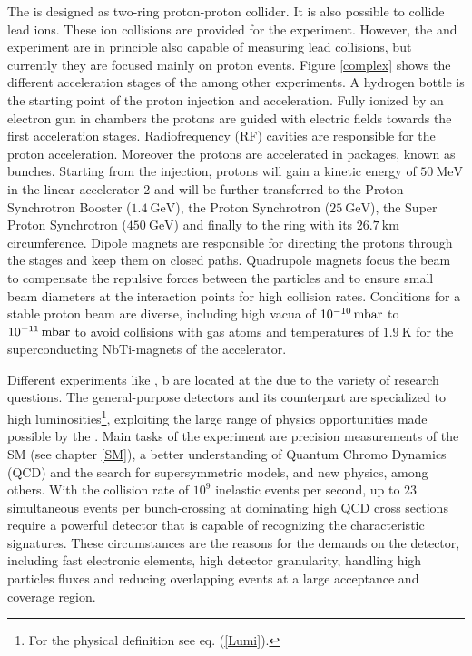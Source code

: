 The {\LHC} is designed as two-ring proton-proton collider. It is also possible to collide lead ions. These ion collisions are provided for the {\ALICE}\cite{ALICE} experiment. However, the {\ATLAS} and {\CMS} experiment are in principle also capable of measuring lead collisions, but currently they are focused mainly on proton events. Figure \ref{complex} shows the different acceleration stages of the {\LHC} among other {\CERN} experiments.\newline
A hydrogen bottle is the starting point of the proton injection and acceleration. Fully ionized by an electron gun in chambers the protons are guided with electric fields towards the first acceleration stages. Radiofrequency (RF) cavities are responsible for the proton acceleration. Moreover the protons are accelerated in packages, known as bunches. \cite{LHCJINST}\cite{LHCSchule} Starting from the injection, protons will gain a kinetic energy of $\SI{50}{\mega\electronvolt}$ in the linear accelerator {\LINAC}2 and will be further transferred to the Proton Synchrotron Booster ($\SI{1.4}{\giga\electronvolt}$), the Proton Synchrotron ($\SI{25}{\giga\electronvolt}$), the Super Proton Synchrotron ($\SI{450}{\giga\electronvolt}$) and finally to the {\LHC} ring with its $\SI{26.7}{\kilo\meter}$ circumference. \cite{CERNabout} Dipole magnets are responsible for directing the protons through the stages and keep them on closed paths. Quadrupole magnets focus the beam to compensate the repulsive forces between the particles and to ensure small beam diameters at the interaction points for high collision rates. Conditions for a stable proton beam are diverse, including high vacua of $\SI{E-10}{\milli\bar}$ to $\SI{E-11}{\milli\bar}$ to avoid collisions with gas atoms and temperatures of $\SI{1.9}{\kelvin}$ for the superconducting NbTi-magnets of the accelerator. \cite{LHCJINST}\cite{LHCSchule}\par
Different experiments like \ALICE\cite{ALICE}, {{\LHC}}b\cite{LHCb} are located at the {\LHC} due to the variety of research questions. The general-purpose detectors {\ATLAS} and its counterpart {\CMS}\cite{CMS} are specialized to high luminosities\footnote{For the physical definition see eq. (\ref{Lumi}).}, exploiting the large range of physics opportunities made possible by the {\LHC}. Main tasks of the {\ATLAS} experiment are precision measurements of the SM (see chapter \ref{SM}), a better understanding of Quantum Chromo Dynamics (QCD) and the search for supersymmetric models, and new physics, among others. With the {\LHC} collision rate of $10^9$ inelastic events per second, up to $23$ simultaneous events per bunch-crossing at dominating high QCD cross sections require a powerful detector that is capable of recognizing the characteristic signatures. These circumstances are the reasons for the demands on the {\ATLAS} detector, including fast electronic elements, high detector granularity, handling high particles fluxes and reducing overlapping events at a large acceptance and coverage region. \cite{ATLASJINST}       
